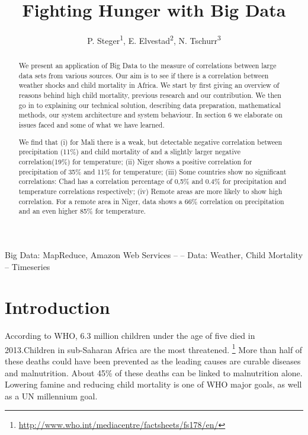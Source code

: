 \documentclass[
10pt, %
a4paper, %
oneside, %
headinclude,footinclude, %
useAMS,
usenatbib
]{mn2e}  %
\title{Fighting Hunger with Big Data} %
\author{P. Steger\textsuperscript{1}, E. Elvestad\textsuperscript{2}, N. Tschurr\textsuperscript{3}}
\date{} %
\begin{document}
\maketitle

\begin{abstract}
We present an application of Big Data to the measure of correlations between large data sets from various sources. Our aim is to see if there is a correlation between weather shocks and child mortality in Africa. We start by first giving an overview of reasons behind high child mortality, previous research and our contribution. We then go in to explaining our technical solution, describing data preparation, mathematical methods, our system architecture and system behaviour. In section 6 we elaborate on issues faced and some of what we have learned.

We find that (i) for Mali there is a weak, but detectable negative correlation between precipitation (11\%) and child mortality of and a slightly larger negative correlation(19\%) for temperature; (ii) Niger shows a positive correlation for precipitation of 35\% and 11\% for temperature; (iii) Some countries show no significant correlations: Chad has a correlation percentage of 0,5\% and 0.4\% for precipitation and temperature correlations respectively; (iv) Remote areas are more likely to show high correlation. For a remote area in Niger, data shows a 66\% correlation on precipitation and an even higher 85\% for temperature.

\end{abstract}

\begin{keywords} Big Data: MapReduce, Amazon Web Services --
    -- Data: Weather, Child Mortality -- Timeseries
\end{keywords}


\setcounter{tocdepth}{2}

{\let\thefootnote\relax{}}
{\let\thefootnote\relax{}}
{\let\thefootnote\relax{}}



\section{Introduction}
According to WHO, 6.3 million children under the age of five died in 2013.Children in sub-Saharan Africa are the most threatened. \footnote{\url{http://www.who.int/mediacentre/factsheets/fs178/en/}} More than half of these deaths could have been prevented as the leading causes are curable diseases and malnutrition. About 45\% of these deaths can be linked to malnutrition alone.  Lowering famine and reducing child mortality is one of WHO major goals, as well as a UN millennium goal.
\end{document}
